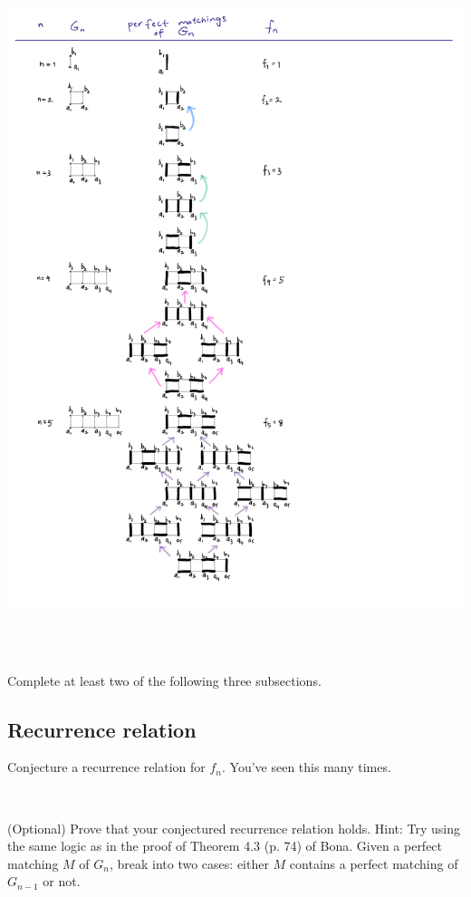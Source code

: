 \documentclass[10pt, oneside]{amsart}
\begin{document}
\includegraphics[height=8in]{portfolio3fig.pdf}



Complete at least two of the following three subsections.

\subsection{Recurrence relation}
\label{recurrence_relation}
Conjecture a recurrence relation for $f_n$. You've seen this many times.

~ 

(Optional)
Prove that your conjectured recurrence relation holds. Hint: Try using the same logic as in the proof of Theorem 4.3 (p. 74) of Bona. Given a perfect matching $M$ of $G_n$, break into two cases: either $M$ contains a perfect matching of $G_{n-1}$ or not.
\end{document}
